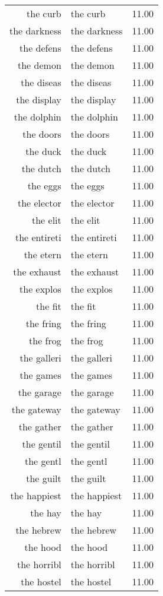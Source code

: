 \begin{table}[ht]
\begin{tabular}{rlr}
  the curb & the curb & 11.00 \\ 
  the darkness & the darkness & 11.00 \\ 
  the defens & the defens & 11.00 \\ 
  the demon & the demon & 11.00 \\ 
  the diseas & the diseas & 11.00 \\ 
  the display & the display & 11.00 \\ 
  the dolphin & the dolphin & 11.00 \\ 
  the doors & the doors & 11.00 \\ 
  the duck & the duck & 11.00 \\ 
  the dutch & the dutch & 11.00 \\ 
  the eggs & the eggs & 11.00 \\ 
  the elector & the elector & 11.00 \\ 
  the elit & the elit & 11.00 \\ 
  the entireti & the entireti & 11.00 \\ 
  the etern & the etern & 11.00 \\ 
  the exhaust & the exhaust & 11.00 \\ 
  the explos & the explos & 11.00 \\ 
  the fit & the fit & 11.00 \\ 
  the fring & the fring & 11.00 \\ 
  the frog & the frog & 11.00 \\ 
  the galleri & the galleri & 11.00 \\ 
  the games & the games & 11.00 \\ 
  the garage & the garage & 11.00 \\ 
  the gateway & the gateway & 11.00 \\ 
  the gather & the gather & 11.00 \\ 
  the gentil & the gentil & 11.00 \\ 
  the gentl & the gentl & 11.00 \\ 
  the guilt & the guilt & 11.00 \\ 
  the happiest & the happiest & 11.00 \\ 
  the hay & the hay & 11.00 \\ 
  the hebrew & the hebrew & 11.00 \\ 
  the hood & the hood & 11.00 \\ 
  the horribl & the horribl & 11.00 \\ 
  the hostel & the hostel & 11.00 \\ 

\end{tabular}
\end{table}
